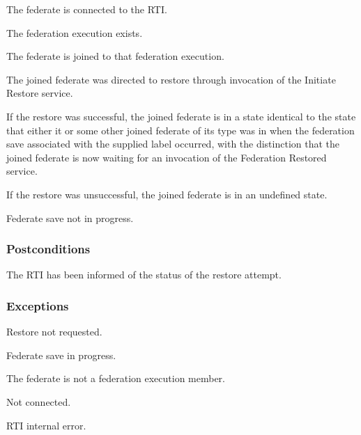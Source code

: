 \begin{stdalphalist}
    \item The federate is connected to the RTI.
    \item The federation execution exists.
    \item The federate is joined to that federation execution.
    \item The joined federate was directed to restore through invocation of the Initiate Restore service.
    \item If the restore was successful, the joined federate is in a state identical to the state that either it or some other joined federate of its type was in when the federation save associated with the supplied label occurred, with the distinction that the joined federate is now waiting for an invocation of the Federation Restored \rtiinitiated{} service.
    \item If the restore was unsuccessful, the joined federate is in an undefined state.
    \item Federate save not in progress.
\end{stdalphalist}

\subsubsection{Postconditions}

\begin{stdalphalist}
    \item The RTI has been informed of the status of the restore attempt.
\end{stdalphalist}

\clearpage


\subsubsection{Exceptions}

\begin{stdalphalist}
    \item Restore not requested.
    \item Federate save in progress.
    \item The federate is not a federation execution member.
    \item Not connected.
    \item RTI internal error.
\end{stdalphalist}

